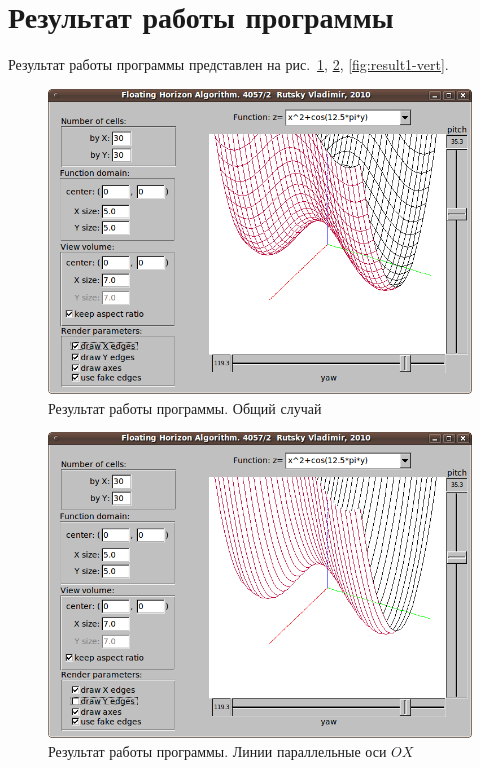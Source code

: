 \documentclass[a4paper,10pt]{article}
\begin{document}
\section{Результат работы программы}
Результат работы программы представлен на рис.~\ref{fig:result1}, \ref{fig:result1-hor}, \ref{fig:result1-vert}.
\begin{figure}[h!]
  \centering
  \includegraphics[width=0.8\linewidth]{./screenshots/result1.png}
  \caption{Результат работы программы. Общий случай}
  \label{fig:result1}
\end{figure}

\begin{figure}[h!]
  \centering
  \includegraphics[width=0.8\linewidth]{./screenshots/result1_hor.png}
  \caption{Результат работы программы. Линии параллельные оси $OX$}
  \label{fig:result1-hor}
\end{figure}
\end{document}

